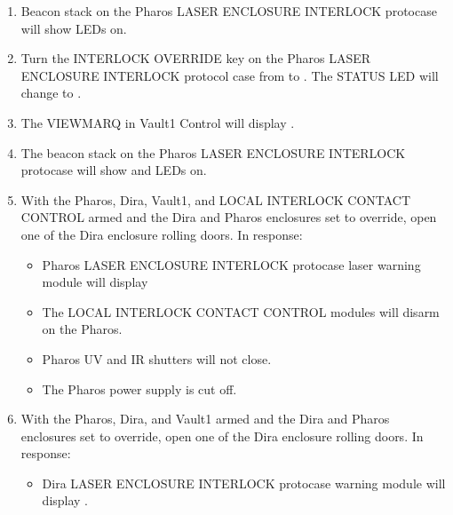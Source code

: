 \documentclass[letterpaper,10pt,english]{sphinxmanual}
\begin{document}
\begin{enumerate}
\begin{itemize}
\item {} 
\sphinxAtStartPar
Vault\sphinxhyphen{}1 east wall

\item {} 
\sphinxAtStartPar
Dira LASER ENCLOSURE INTERLOCK protocase.

\end{itemize}

\item {} 
\sphinxAtStartPar
Beacon stack on the Pharos LASER ENCLOSURE INTERLOCK protocase will show  LEDs on.

\item {} 
\sphinxAtStartPar
Turn the INTERLOCK OVERRIDE key on the Pharos LASER ENCLOSURE INTERLOCK protocol case from  to . The STATUS LED will change to .

\item {} 
\sphinxAtStartPar
The VIEWMARQ in Vault\sphinxhyphen{}1 Control will display .

\item {} 
\sphinxAtStartPar
The beacon stack on the Pharos LASER ENCLOSURE INTERLOCK protocase will show  and  LEDs on.

\item {} 
\sphinxAtStartPar
With the Pharos, Dira, Vault\sphinxhyphen{}1, and LOCAL INTERLOCK CONTACT CONTROL armed and the Dira and Pharos enclosures set to override, open one of the Dira enclosure rolling doors.
In response:
\begin{itemize}
\item {} 
\sphinxAtStartPar
Pharos LASER ENCLOSURE INTERLOCK protocase laser warning module will display 

\item {} 
\sphinxAtStartPar
The LOCAL INTERLOCK CONTACT CONTROL modules will disarm on the Pharos.

\item {} 
\sphinxAtStartPar
Pharos UV and IR shutters will not close.

\item {} 
\sphinxAtStartPar
The Pharos power supply is cut off.

\end{itemize}

\item {} 
\sphinxAtStartPar
With the Pharos, Dira, and Vault\sphinxhyphen{}1 armed and the Dira and Pharos enclosures set to override, open one of the Dira enclosure rolling doors.
In response:
\begin{itemize}
\item {} 
\sphinxAtStartPar
Dira LASER ENCLOSURE INTERLOCK protocase warning module will display .


\end{itemize}
\end{enumerate}
\end{document}
